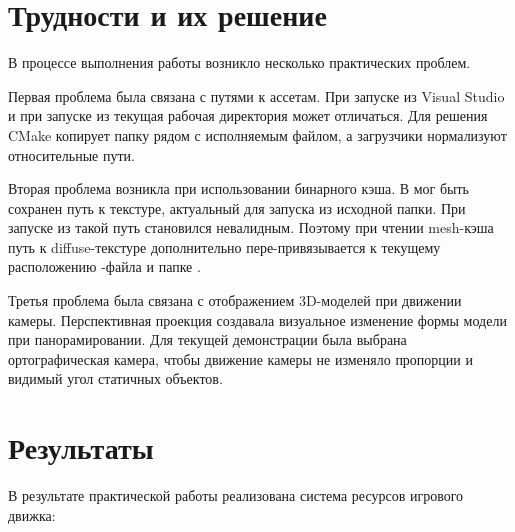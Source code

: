 \documentclass[14pt,a4paper]{extarticle}
\begin{document}


\section{Трудности и их решение}

В процессе выполнения работы возникло несколько практических проблем.

Первая проблема была связана с путями к ассетам. При запуске из Visual Studio и при запуске из
 текущая рабочая директория может отличаться. Для решения CMake копирует папку
 рядом с исполняемым файлом, а загрузчики нормализуют относительные пути.

Вторая проблема возникла при использовании бинарного кэша. В  мог быть сохранен путь к
текстуре, актуальный для запуска из исходной папки. При запуске из  такой путь становился
невалидным. Поэтому при чтении mesh-кэша путь к diffuse-текстуре дополнительно пере-привязывается к текущему
расположению -файла и папке .

Третья проблема была связана с отображением 3D-моделей при движении камеры. Перспективная проекция создавала
визуальное изменение формы модели при панорамировании. Для текущей демонстрации была выбрана ортографическая
камера, чтобы движение камеры не изменяло пропорции и видимый угол статичных объектов.

\section{Результаты}

В результате практической работы реализована система ресурсов игрового движка:
\end{document}
